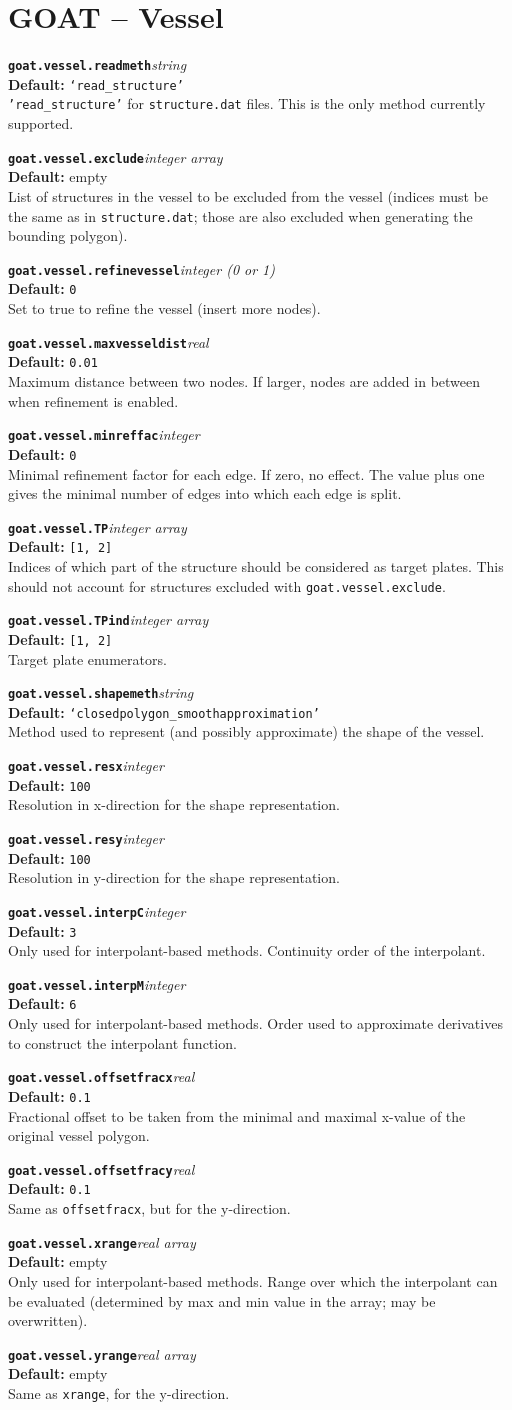 \documentclass[10pt,a4paper]{article}
\newcommand{\sw}[4]{%
  \par\vspace{0.7em}%
  \begin{minipage}{\linewidth}\raggedright
    \textbf{\texttt{#1}}\hfill\textit{#2}\\[0.1em]
    \textbf{Default:} #3\\[0.1em]
    #4\par
    \vspace{0.3em}{\color{swgrey}\hrule}
  \end{minipage}\par}
\begin{document}
\section{GOAT -- Vessel}
\sw{goat.vessel.readmeth}{string}{\texttt{`read\_structure'}}{\texttt{'read\_structure'} for \texttt{structure.dat} files. This is the only method currently supported.}
\sw{goat.vessel.exclude}{integer array}{empty}{List of structures in the vessel to be excluded from the vessel (indices must be the same as in \texttt{structure.dat}; those are also excluded when generating the bounding polygon).}
\sw{goat.vessel.refinevessel}{integer (0 or 1)}{\texttt{0}}{Set to true to refine the vessel (insert more nodes).}
\sw{goat.vessel.maxvesseldist}{real}{\texttt{0.01}}{Maximum distance between two nodes. If larger, nodes are added in between when refinement is enabled.}
\sw{goat.vessel.minreffac}{integer}{\texttt{0}}{Minimal refinement factor for each edge. If zero, no effect. The value plus one gives the minimal number of edges into which each edge is split.}
\sw{goat.vessel.TP}{integer array}{\texttt{[1, 2]}}{Indices of which part of the structure should be considered as target plates. This should not account for structures excluded with \texttt{goat.vessel.exclude}.}
\sw{goat.vessel.TPind}{integer array}{\texttt{[1, 2]}}{Target plate enumerators.}
\sw{goat.vessel.shapemeth}{string}{\texttt{`closedpolygon\_smoothapproximation'}}{Method used to represent (and possibly approximate) the shape of the vessel.}
\sw{goat.vessel.resx}{integer}{\texttt{100}}{Resolution in x-direction for the shape representation.}
\sw{goat.vessel.resy}{integer}{\texttt{100}}{Resolution in y-direction for the shape representation.}
\sw{goat.vessel.interpC}{integer}{\texttt{3}}{Only used for interpolant-based methods. Continuity order of the interpolant.}
\sw{goat.vessel.interpM}{integer}{\texttt{6}}{Only used for interpolant-based methods. Order used to approximate derivatives to construct the interpolant function.}
\sw{goat.vessel.offsetfracx}{real}{\texttt{0.1}}{Fractional offset to be taken from the minimal and maximal x-value of the original vessel polygon.}
\sw{goat.vessel.offsetfracy}{real}{\texttt{0.1}}{Same as \texttt{offsetfracx}, but for the y-direction.}
\sw{goat.vessel.xrange}{real array}{empty}{Only used for interpolant-based methods. Range over which the interpolant can be evaluated (determined by max and min value in the array; may be overwritten).}
\sw{goat.vessel.yrange}{real array}{empty}{Same as \texttt{xrange}, for the y-direction.}
\end{document}
